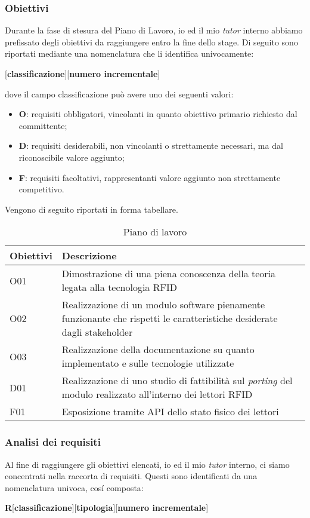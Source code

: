 \subsubsection*{Obiettivi}
Durante la fase di stesura del Piano di Lavoro, io ed il mio \emph{tutor} interno abbiamo prefissato degli obiettivi da raggiungere entro la fine dello stage.
Di seguito sono riportati mediante una nomenclatura che li identifica univocamente:
\begin{center}
    [\textbf{classificazione}][\textbf{numero incrementale}]
\end{center}
dove il campo classificazione può avere uno dei seguenti valori:
\begin{itemize}
    \item \textbf{O}: requisiti obbligatori, vincolanti in quanto obiettivo primario richiesto dal committente;
    \item \textbf{D}: requisiti desiderabili, non vincolanti o strettamente necessari, ma dal riconoscibile valore aggiunto;
    \item \textbf{F}: requisiti facoltativi, rappresentanti valore aggiunto non strettamente competitivo.
\end{itemize}
Vengono di seguito riportati in forma tabellare.
\begin{table}
    \label{tab:obiettivi}
    \begin{tabularx}{\textwidth}{ | X | X |}
    \hline
    \textbf{Obiettivi} & \textbf{Descrizione}\\
    \hline
    O01 & Dimostrazione di una piena conoscenza della teoria legata alla tecnologia RFID \\
    \hline
    O02 & Realizzazione di un modulo software pienamente funzionante che rispetti le caratteristiche desiderate dagli stakeholder \\
    \hline
    O03 & Realizzazione della documentazione su quanto implementato e sulle tecnologie utilizzate \\
    \hline
    D01 & Realizzazione di uno studio di fattibilità sul \emph{porting} del modulo realizzato all'interno dei lettori RFID \\
    \hline
    F01 & Esposizione tramite API dello stato fisico dei lettori \\
    \hline
    \end{tabularx}
    \caption{Piano di lavoro}
\end{table}

\subsubsection*{Analisi dei requisiti}
Al fine di raggiungere gli obiettivi elencati, io ed il mio \emph{tutor} interno, ci siamo concentrati nella raccorta di requisiti. Questi sono identificati
da una nomenclatura univoca, cosí composta:
\begin{center}
    \textbf{R}[\textbf{classificazione}][\textbf{tipologia}][\textbf{numero incrementale}]
\end{center}

